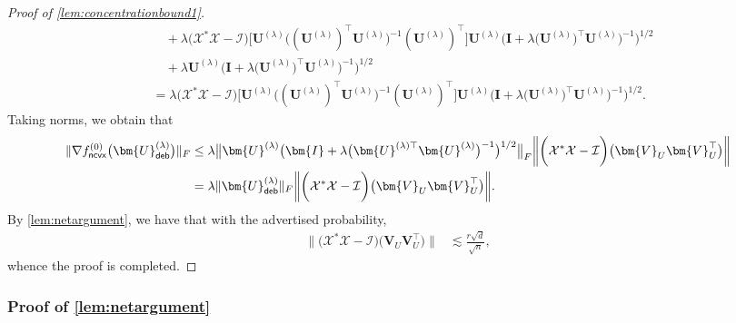 \documentclass[10pt]{article}
\newcommand{\s}{^*}
\renewcommand{\t}{^{\top}}
\newcommand{\inv}{^{-1}}
\theoremstyle{definition}
\begin{document}
\begin{proof}[Proof of \cref{lem:concentrationbound1}]
\begin{align}
      &\quad + \lambda \bigg( \mathcal{X}\s \mathcal{X} - \mathcal{I} \bigg) \bigg[ \bm{U}^{(\lambda)} \big( (\bm{U}^{(\lambda)})\t  \bm{U}^{(\lambda)} \big)\inv (\bm{U}^{(\lambda)})\t \bigg] \bm{U}^{(\lambda)} \bigg( \bm{I} + \lambda \big( \bm{U}^{(\lambda)})\t \bm{U}^{(\lambda)} \big)\inv \bigg)^{1/2}  \\
      &\quad + \lambda \bm{U}^{(\lambda)} \bigg( \bm{I} + \lambda \big( \bm{U}^{(\lambda)})\t \bm{U}^{(\lambda)} \big)\inv \bigg)^{1/2} \\
      &= \lambda \bigg( \mathcal{X}\s \mathcal{X} - \mathcal{I} \bigg) \bigg[ \bm{U}^{(\lambda)} \big( (\bm{U}^{(\lambda)})\t  \bm{U}^{(\lambda)} \big)\inv (\bm{U}^{(\lambda)})\t \bigg] \bm{U}^{(\lambda)} \bigg( \bm{I} + \lambda \big( \bm{U}^{(\lambda)})\t \bm{U}^{(\lambda)} \big)\inv \bigg)^{1/2} .
\end{align}
Taking norms, we obtain that
\begin{align}
    \| \nabla f^{(0)}_{{\sf ncvx}} \big( \bm{U}^{(\lambda)}_{{\sf deb}} \big) \|_F &\leq \lambda \big\| \bm{U}^{(\lambda)} \big( \bm{I} + \lambda \big( \bm{U}^{(\lambda)\top} \bm{U}^{(\lambda)} \big)\inv \big)^{1/2}  \big\|_F \bigg\| \bigg( \mathcal{X}\s \mathcal{X} - \mathcal{I} \bigg) \big(  \bm{V}_U \bm{V}_U\t \big)\bigg \| \\
    &= \lambda \| \bm{U}^{(\lambda)}_{{\sf deb}} \|_F \bigg\| \bigg( \mathcal{X}\s \mathcal{X} - \mathcal{I} \bigg) \big(  \bm{V}_U \bm{V}_U\t \big)\bigg\|.
\end{align}
 By \cref{lem:netargument}, we have that with the advertised probability,
\begin{align}
    \bigg\| \bigg( \mathcal{X}\s \mathcal{X} - \mathcal{I} \bigg) \big(  \bm{V}_U \bm{V}_U\t \big)\bigg \| &\lesssim \frac{r \sqrt{d}}{\sqrt{n}},
\end{align}
whence the proof is completed.
\end{proof}

\subsubsection{Proof of \cref{lem:netargument}}
\label{sec:netargumentproof}
\end{document}
